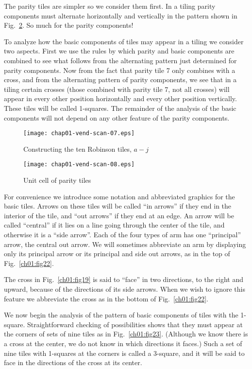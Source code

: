 \documentclass[reqno]{stml-l}
\theoremstyle{plain}
\theoremstyle{definition}
\numberwithin{equation}{chapter}
\begin{document}
The parity tiles are simpler so we consider them first. In a tiling parity components must alternate horizontally and vertically in the pattern shown in Fig.~\ref{ch01:fig21}. So much for the parity components!

To analyze how the basic components of tiles may appear in a tiling we consider two aspects. First we use the rules by which parity
and basic components are combined to see what follows from the alternating pattern just determined for parity components. Now from the fact that parity tile 7 only combines with a cross, and from the alternating pattern of parity components, we see that in a tiling certain crosses (those combined with parity tile 7, not all crosses) will appear in every other position horizontally and every other position vertically. These tiles will be called 1-squares. The remainder of the analysis of the basic components will not depend on any other feature of the parity components.

\begin{figure}[h]
\texttt{[image: chap01-vend-scan-07.eps]}
\caption{Constructing the ten Robinson tiles,
$a-j$}
\label{ch01:fig20}
\end{figure}

\begin{figure}[h]
\texttt{[image: chap01-vend-scan-08.eps]}
\caption{Unit cell of parity tiles}
\label{ch01:fig21}
\end{figure}

For convenience we introduce some notation and abbreviated graphics for the basic tiles. Arrows on these tiles will be called ``in arrows'' if they end in the interior of the tile, and ``out arrows'' if they end at an edge. An arrow will be called ``central'' if it lies on a line going through the center of the tile, and otherwise it is a ``side arrow''. Each of the four types of arm has one ``principal'' arrow, the central out arrow. We will sometimes abbreviate an arm by displaying only its principal arrow or its principal and side out arrows, as in the top of Fig.~\ref{ch01:fig22}.

The cross in Fig.~\ref{ch01:fig19} is said to ``face'' in two directions, to the right and upward, because of the directions of its side arrows. When we wish to ignore this feature we abbreviate the cross as in the bottom of Fig.~\ref{ch01:fig22}.

We now begin the analysis of the pattern of basic components of tiles with the 1-square. Straightforward checking of possibilities shows that they must appear at the corners of sets of nine tiles as in Fig.~\ref{ch01:fig23}. (Although we know there is a cross at the center, we do not know in which directions it faces.) Such a set of nine tiles with 1-squares at the corners is called a 3-square, and it will be said to face in the directions of the cross at its center.
\end{document}
